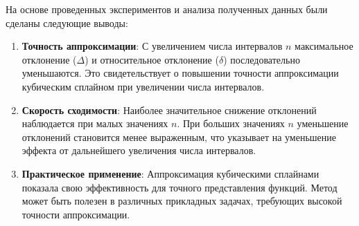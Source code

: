 \documentclass{article}
\begin{document}
На основе проведенных экспериментов и анализа полученных данных были сделаны следующие выводы:
\begin{enumerate}
    \item \textbf{Точность аппроксимации}: С увеличением числа интервалов \( n \) максимальное отклонение (\( \Delta \)) и относительное отклонение (\( \delta \)) последовательно уменьшаются. Это свидетельствует о повышении точности аппроксимации кубическим сплайном при увеличении числа интервалов.
    \item \textbf{Скорость сходимости}: Наиболее значительное снижение отклонений наблюдается при малых значениях \( n \). При больших значениях \( n \) уменьшение отклонений становится менее выраженным, что указывает на уменьшение эффекта от дальнейшего увеличения числа интервалов.
    \item \textbf{Практическое применение}: Аппроксимация кубическими сплайнами показала свою эффективность для точного представления функций. Метод может быть полезен в различных прикладных задачах, требующих высокой точности аппроксимации.
\end{enumerate}
\end{document}
